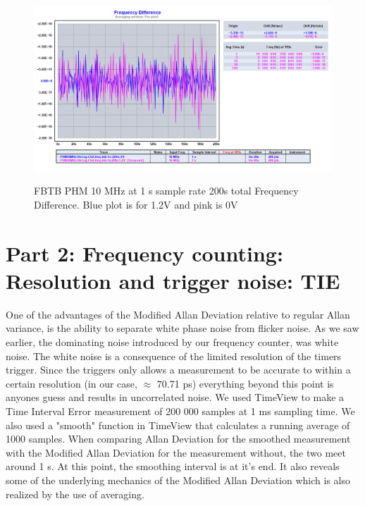 \documentclass[11pt,english,a4paper]{article}
\begin{document}
\begin{figure}[!htb]
  \centering
    \includegraphics[width=1\textwidth]{PHM10MHz-Ref-og-ChA-freq-btb-1s-200s-frec_diff.png}
    \label{fig:PHM_10MHz_0V_1.2V_freq_diff}
    \caption{FBTB PHM 10 MHz at 1 s sample rate 200s total Frequency Difference. Blue plot is for 1.2V and pink is 0V}
\end{figure}


\section{Part 2: Frequency counting: Resolution and trigger noise: TIE}
One of the advantages of the Modified Allan Deviation relative to regular Allan variance, is the ability to separate white phase noise from flicker noise. As we saw earlier, the dominating noise introduced by our frequency counter, was white noise. The white noise is a consequence of the limited resolution of the timers trigger. Since the triggers only allows a measurement to be accurate to within a certain resolution (in our case, $\approx$ 70.71 ps) everything beyond this point is anyones guess and results in uncorrelated noise. We used TimeView to make a Time Interval Error measurement of 200 000 samples at 1 ms sampling time. We also used a "smooth" function in TimeView that calculates a running average of 1000 samples. When comparing Allan Deviation for the smoothed measurement with the Modified Allan Deviation for the measurement without, the two meet around 1 s. At this point, the smoothing interval is at it's end. It also reveals some of the underlying mechanics of the Modified Allan Deviation which is also realized by the use of averaging.
\end{document}

